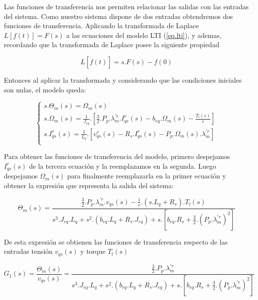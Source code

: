 \documentclass{article}
\begin{document}
Las funciones de transferencia nos permiten relacionar las salidas con las entradas del sistema.
Como nuestro sistema dispone de dos entradas obtendremos dos funciones de transferencia. Aplicando 
la transformada de Laplace $L[f(t)] = F(s)$ a las ecuaciones del modelo LTI (\ref{eq.lti}), y ademas,
recordando que la transformada de Laplace posee la siguiente propiedad

\begin{equation}
        L[\dot{f}(t)] = s.F(s) - f(0)
\end{equation}

Entonces al aplicar la transformada y considerando que las condiciones iniciales son nulas, el 
modelo queda:

\begin{equation}
    \begin{cases}
        s.\Theta_{m}(s) = \Omega_{m}(s)\\
        s.\Omega_{m}(s) = \frac{1}{J_{eq}}.[\frac{3}{2}.P_{p}.\lambda_{m}^{\prime r}.I_{qs}^r(s) - b_{eq}.\Omega_m(s) - \frac{T_{l}(s)}{r}]\\
        s.I_{qs}^r(s) = \frac{1}{L_{q}}.[v_{qs}^r(s) - R_{s}.I_{qs}^r(s) - P_{p}.\Omega_{m}(s).\lambda_{m}^{\prime r}]\\
    \end{cases}
\end{equation}

Para obtener las funciones de transferencia del modelo, primero despejamos $I_{qs}^r(s)$
de la tercera ecuación y la reemplazamos en la segunda. Luego despejamos $\Omega_m(s)$ para 
finalmente reemplazarla en la primer ecuación y obtener la expresión que representa la salida del sistema: 

\begin{equation}
    \Theta_{m}(s) = \frac{\frac{3}{2}.P_{p}.\lambda_{m}^{\prime r}.v_{qs}(s) - \frac{1}{r}.(s.L_{q}+R_{s}).T_{l}(s)}{s^3.J_{eq}.L_{q} + s^2.(b_{eq}.L_{q} +  R_{s}.J_{eq}) + s.[b_{eq}.R_{s}+\frac{3}{2}.(P_{p}.\lambda_{m}^{\prime r})^2]}
\end{equation}

De esta expresión se obtienen las funciones de transferencia respecto de las entradas tensión $v_{qs}(s)$ y torque $T_{l}(s)$

\begin{equation}\label{eq.trasnferencia_1}
    G_{1}(s) = \frac{\Theta_{m}(s)}{v_{qs}(s)} = \frac{\frac{3}{2}.P_{p}.\lambda_{m}^{\prime r}}{s^3.J_{eq}.L_{q} + s^2.(b_{eq}.L_{q} +  R_{s}.J_{eq}) + s.[b_{eq}.R_{s}+\frac{3}{2}.(P_{p}.\lambda_{m}^{\prime r})^2]}
\end{equation}
\end{document}
